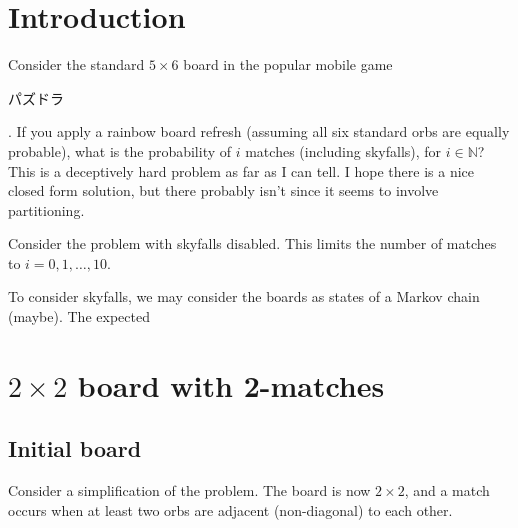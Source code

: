 \documentclass[12pt]{article}
\newcommand{\N}{\mathbb{N}}
\theoremstyle{definition}
\begin{document}
\tableofcontents
\section{Introduction}
Consider the standard $5\times 6$ board in the popular mobile game \begin{CJK}{UTF8}{min}パズドラ\end{CJK}. If you apply a rainbow board refresh (assuming all six standard orbs are equally probable), what is the probability of $i$ matches (including skyfalls), for $i\in\N$?
This is a deceptively hard problem as far as I can tell. I hope there is a nice closed form solution, but there probably isn't since it seems to involve partitioning.

Consider the problem with skyfalls disabled.
This limits the number of matches to $i=0,1,\dots,10$.

To consider skyfalls, we may consider the boards as states of a Markov chain (maybe). The expected 

\section{$2\times2$ board with 2-matches}
\subsection{Initial board}
Consider a simplification of the problem.
The board is now $2 \times 2$, and a match occurs when at least two orbs are adjacent (non-diagonal) to each other.
\end{document}
